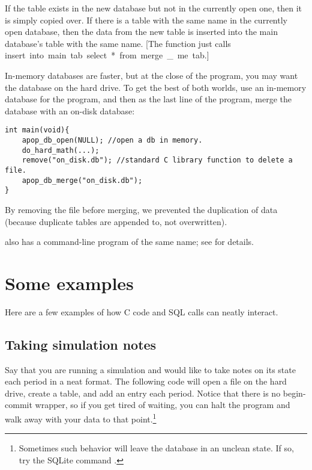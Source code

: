 If the table exists in the new database but not in the currently open
one, then it is simply copied over. If there is a table with the same
name in the currently open database, then the data from the new table is
inserted into the main database's table with the same name. [The function
just calls \si{insert into main.tab select * from merge\_me.tab}.]

In-memory databases are faster, but at the close of the program, you
may want the database on the hard drive. To get the best of both
worlds, use an in-memory database for the program, and then as the last
line of the program, merge the database with an on-disk database:
\begin{lstlisting}
int main(void){
    apop_db_open(NULL); //open a db in memory.
    do_hard_math(...);
    remove("on_disk.db"); //standard C library function to delete a file.
    apop_db_merge("on_disk.db");
}
\end{lstlisting}
By removing the file before merging, we prevented the duplication of
data (because duplicate tables are appended to, not overwritten).

 also has a command-line program of the
same name; see  for details.



\section{Some examples} 
Here are a few examples of how C code and SQL calls can neatly interact.

\subsection{Taking simulation notes}\label{createeg}
Say that you are running a simulation and would like to take notes on
its state each period in a neat format. The following code will open a
file on the hard drive, create a table, and add an entry each period.
Notice that there is no begin-commit wrapper, so if you get tired of
waiting, you can halt the program and walk away with
your data to that point.\footnote{Sometimes such behavior will leave the database in
an unclean state. If so, try the SQLite command .}


